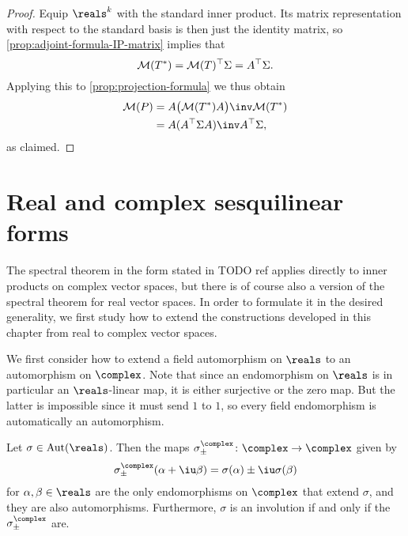 \documentclass[a4paper, 11pt]{memoir}
\theoremstyle{plaincustomnumber}
\theoremstyle{changedotbreakcustomnumber}
\newcommand{\trans}{^{\top}}
\begin{document}
\begin{proof}
    Equip $\reals^k$ with the standard inner product. Its matrix representation with respect to the standard basis is then just the identity matrix, so \cref{prop:adjoint-formula-IP-matrix} implies that
    \begin{equation*}
        \smr{T^*}
            = \smr{T}\trans \Sigma
            = A\trans \Sigma.
    \end{equation*}
    Applying this to \cref{prop:projection-formula} we thus obtain
    \begin{align*}
        \smr{P}
            &= A \bigl( \smr{T^*} A \bigr)\inv \smr{T^*} \\
            &= A (A\trans \Sigma A)\inv A\trans \Sigma,
    \end{align*}
    as claimed.
\end{proof}


\section{Real and complex sesquilinear forms}

The spectral theorem in the form stated in TODO ref applies directly to inner products on complex vector spaces, but there is of course also a version of the spectral theorem for real vector spaces. In order to formulate it in the desired generality, we first study how to extend the constructions developed in this chapter from real to complex vector spaces.

\newpar

We first consider how to extend a field automorphism on $\reals$ to an automorphism on $\complex$. Note that since an endomorphism on $\reals$ is in particular an $\reals$-linear map, it is either surjective or the zero map. But the latter is impossible since it must send $1$ to $1$, so every field endomorphism is automatically an automorphism.

\begin{lemma}
    Let $\sigma \in \Aut(\reals)$. Then the maps $\sigma^\complex_{\pm} \colon \complex \to \complex$ given by
    \begin{equation*}
        \sigma^\complex_{\pm}(\alpha + \iu \beta)
            = \sigma(\alpha) \pm \iu \sigma(\beta)
    \end{equation*}
    for $\alpha,\beta \in \reals$ are the only endomorphisms on $\complex$ that extend $\sigma$, and they are also automorphisms. Furthermore, $\sigma$ is an involution if and only if the $\sigma^\complex_\pm$ are.
\end{lemma}
\end{document}
